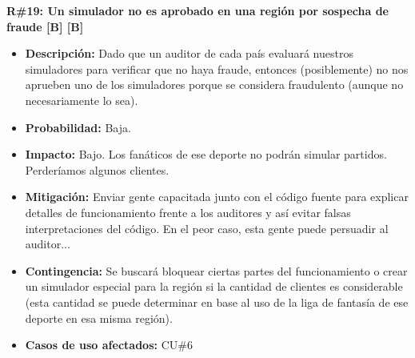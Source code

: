 \noindent\textbf{R\#19: Un simulador no es aprobado en una región por sospecha de fraude [B] [B] } 
\begin{itemize}
	\item{\textbf{Descripción:} Dado que un auditor de cada país evaluará nuestros simuladores para verificar que no haya fraude, entonces (posiblemente) no nos aprueben uno de los simuladores porque se considera fraudulento (aunque no necesariamente lo sea).}
	\item{\textbf{Probabilidad:} Baja.}
	\item{\textbf{Impacto:} Bajo. Los fanáticos de ese deporte no podrán simular partidos. Perderíamos algunos clientes.}
	\item{\textbf{Mitigación:} Enviar gente capacitada junto con el código fuente para explicar detalles de funcionamiento frente a los auditores y así evitar falsas interpretaciones del código. En el peor caso, esta gente puede persuadir al auditor...}
	\item{\textbf{Contingencia:} Se buscará bloquear ciertas partes del funcionamiento o crear un simulador especial para la región si la cantidad de clientes es considerable (esta cantidad se puede determinar en base al uso de la liga de fantasía de ese deporte en esa misma región).}
	\item{\textbf{Casos de uso afectados:} CU\#6}
\end{itemize}













